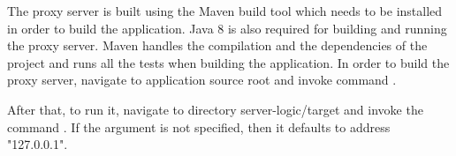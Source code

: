 \documentclass[..thesis.tex]{subfiles}
\begin{document}
The proxy server is built using the Maven build tool which needs to be installed in order to build the application.
Java 8 is also required for building and running the proxy server.
Maven handles the compilation and the dependencies of the project and runs all the tests when building the application.
In order to build the proxy server, navigate to application source root and invoke command .

\begin{sloppypar}
  After that, to run it, navigate to directory server-logic/target and invoke the command
  .
  If the  argument is not specified, then it defaults to address "127.0.0.1".
\end{sloppypar}
\end{document}
